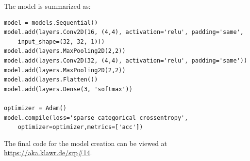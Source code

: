 The model is summarized as:

\begin{lstlisting}
model = models.Sequential()
model.add(layers.Conv2D(16, (4,4), activation='relu', padding='same',
    input_shape=(32, 32, 1)))
model.add(layers.MaxPooling2D(2,2))
model.add(layers.Conv2D(32, (4,4), activation='relu', padding='same'))
model.add(layers.MaxPooling2D(2,2))
model.add(layers.Flatten())
model.add(layers.Dense(3, 'softmax'))

optimizer = Adam()
model.compile(loss='sparse_categorical_crossentropy',
    optimizer=optimizer,metrics=['acc'])
\end{lstlisting}

The final code for the model creation can be viewed at \url{https://aka.klawr.de/srp\#14}.
